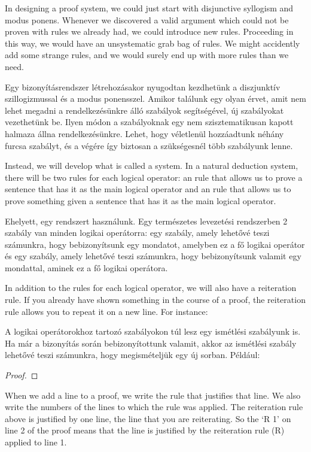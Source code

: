 In designing a proof system, we could just start with disjunctive syllogism and modus ponens. Whenever we discovered a valid argument which could not be proven with rules we already had, we could introduce new rules. Proceeding in this way, we would have an unsystematic grab bag of rules. We might accidently add some strange rules, and we would surely end up with more rules than we need.

Egy bizonyításrendszer létrehozásakor nyugodtan kezdhetünk a diszjunktív szillogizmussal és a modus ponensszel. Amikor találunk egy olyan érvet, amit nem lehet megadni a rendelkezésünkre álló szabályok segítségével, új szabályokat vezethetünk be. Ilyen módon a szabályoknak egy nem szisztematikusan kapott halmaza állna rendelkezésünkre. Lehet, hogy véletlenül hozzáadtunk néhány furcsa szabályt, és a végére így biztosan a szükségesnél több szabályunk lenne.

Instead, we will develop what is called a  system. In a natural deduction system, there will be two rules for each logical operator: an  rule that allows us to prove a sentence that has it as the main logical operator and an  rule that allows us to prove something given a sentence that has it as the main logical operator.

Ehelyett, egy  rendszert használunk. Egy természetes levezetési rendszerben 2 szabály van minden logikai operátorra: egy  szabály, amely lehetővé teszi számunkra, hogy bebizonyítsunk egy mondatot, amelyben ez a fő logikai operátor és egy  szabály, amely lehetővé teszi számunkra, hogy bebizonyítsunk valamit egy mondattal, aminek ez a fő logikai operátora.

In addition to the rules for each logical operator, we will also have a reiteration rule. If you already have shown something in the course of a proof, the reiteration rule allows you to repeat it on a new line. For instance:

A logikai operátorokhoz tartozó szabályokon túl lesz egy ismétlési szabályunk is. Ha már a bizonyítás során bebizonyítottunk valamit, akkor az ismétlési szabály lehetővé teszi számunkra, hogy megismételjük egy új sorban. Például:

\begin{proof}
	 
\end{proof}

When we add a line to a proof, we write the rule that justifies that line. We also write the numbers of the lines to which the rule was applied. The reiteration rule above is justified by one line, the line that you are reiterating. So the `R 1' on line 2 of the proof means that the line is justified by the reiteration rule (R) applied to line 1.


